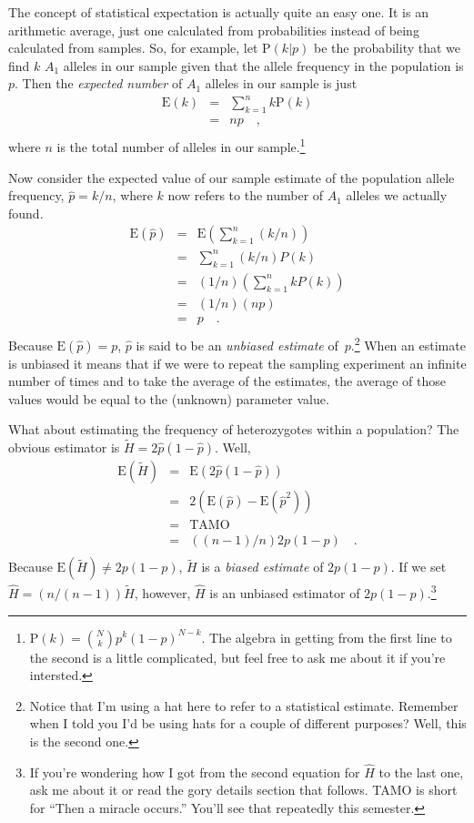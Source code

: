\documentclass[12pt]{article}
\begin{document}
The concept of statistical expectation is actually quite an easy
one. It is an arithmetic average, just one calculated from
probabilities instead of being calculated from samples. So, for
example, let $\mbox{P}(k|p)$ be the probability that we find $k$ $A_1$
alleles in our sample given that the allele frequency in the
population is $p$. Then the {\it expected number\/} of $A_1$ alleles
in our sample is just
\begin{eqnarray*}
\mbox{E}(k) &=& \sum_{k=1}^n k \mbox{P}(k) \\
     &=& n p \quad , \\
\end{eqnarray*}
where $n$ is the total number of alleles in our
sample.\footnote{$\mbox{P}(k) = {N \choose k}p^k(1-p)^{N-k}$. The
  algebra in getting from the first line to the second is a little
  complicated, but feel free to ask me about it if you're intersted.}

Now consider the expected value of our sample estimate of the
population allele frequency, $\hat p = k/n$, where $k$ now refers to
the number of $A_1$ alleles we actually found.
\begin{eqnarray*}
\mbox{E}(\hat p) &=& \mbox{E}\left(\sum_{k=1}^n (k/n)\right) \\
          &=& \sum_{k=1}^n (k/n) P(k) \\
          &=& (1/n)\left(\sum_{k=1}^n k P(k)\right) \\
          &=& (1/n)(n p) \\
          &=& p \quad . \\
\end{eqnarray*}
Because $\mbox{E}(\hat p) = p$, $\hat p$ is said to be an {\it
  unbiased estimate} of~$p$.\footnote{Notice
  that I'm using a hat here to refer to a statistical
  estimate. Remember when I told you I'd be using hats for a couple of
  different purposes? Well, this is the second one.} When an estimate
is unbiased it means that if we were to repeat the sampling experiment
an infinite number of times and to take the average of the estimates,
the average of those values would be equal to the (unknown) parameter
value.

What about estimating the frequency of heterozygotes within a
population? The obvious estimator is $\tilde H = 2\hat p (1 - \hat
p)$. Well,
\begin{eqnarray*}
\mbox{E}(\tilde H) &=& \mbox{E}\left(2\hat p (1 - \hat p)\right) \\
     &=& 2\left(\mbox{E}(\hat p) - \mbox{E}({\hat p}^2)\right) \\
     &=& \mbox{TAMO} \\
     &=& ((n-1)/n)2p(1-p) \quad . \\
\end{eqnarray*}
Because $\mbox{E}(\tilde H) \ne 2p(1-p)$, $\tilde H$ is a {\it biased
estimate\/} of $2p(1-p)$. If we set $\hat H = (n/(n-1))\tilde H$,
however, $\hat H$ is an unbiased estimator of $2p(1-p)$.\footnote{If
  you're wondering how I got from the second equation for $\hat H$ to
  the last one, ask me about it or read the gory details section that
  follows. TAMO is short for ``Then a miracle occurs.'' You'll see
  that repeatedly this semester.}
\end{document}
